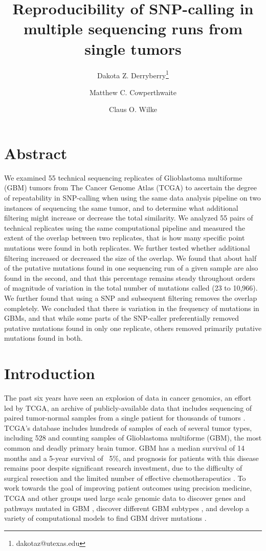 \documentclass[11pt]{article} %
\title{Reproducibility of SNP-calling in multiple sequencing runs from single tumors}
\author[1]{Dakota Z. Derryberry\thanks{dakotaz@utexas.edu}}
\author[3]{Matthew C. Cowperthwaite}
\author[1,2]{Claus O. Wilke}
\affil[1]{The University of Texas at Austin, Cell \& Molecular Biology}
\affil[2]{The University of Texas at Austin, Integrative Biology}
\affil[3]{St. David's NeuroTexas Institute Research Foundation}
\begin{document}
\maketitle

\section*{Abstract}

We examined 55 technical sequencing replicates of Glioblastoma multiforme (GBM) tumors from The Cancer Genome Atlas (TCGA) to ascertain the degree of repeatability in SNP-calling when using the same data analysis pipeline on two instances of sequencing the same tumor, and to determine what additional filtering might increase or decrease the total similarity. We analyzed 55 pairs of technical replicates using the same computational pipeline and measured the extent of the overlap between two replicates, that is how many specific point mutations were found in both replicates. We further tested whether additional filtering increased or decreased the size of the overlap.  We found that about half of the putative mutations found in one sequencing run of a given sample are also found in the second, and that this percentage remains steady throughout orders of magnitude of variation in the total number of mutations called (23 to 10,966). We further found that using a SNP and subsequent filtering removes the overlap completely. We concluded that there is variation in the frequency of mutations in GBMs, and that while some parts of the SNP-caller preferentially removed putative mutations found in only one replicate, others removed primarily putative mutations found in both.

\section*{Introduction}

The past six years have seen an explosion of data in cancer genomics, an effort led by TCGA, an archive of publicly-available data that includes sequencing of paired tumor-normal samples from a single patient for thousands of tumors \citep{TCGA-GBM, TCGA-GBM-13}. TCGA's database includes hundreds of samples of each of several tumor types, including 528 and counting samples of Glioblastoma multiforme (GBM), the most common and deadly primary brain tumor. GBM has a median survival of 14 months and a 5-year survival of ~5\%, and prognosis for patients with this disease remains poor despite significant research investment, due to the difficulty of surgical resection and the limited number of effective chemotherapeutics \citep{GBM-stats}. To work towards the goal of improving patient outcomes using precision medicine, TCGA and other groups \citep{Parsons} used large scale genomic data to discover genes and pathways mutated in GBM \citep{pathways}, discover different GBM subtypes \citep{subtypes}, and develop a variety of computational models to find GBM driver mutations \citep{drivers}.
\end{document}
